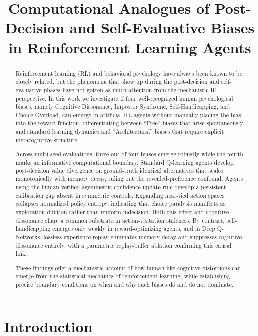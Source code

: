 \documentclass[conference]{IEEEtran}
\title{Computational Analogues of Post-Decision and Self-Evaluative Biases in Reinforcement Learning Agents}
\author{\IEEEauthorblockN{Ronak Daniel}
\IEEEauthorblockA{\textit{Computational Cognitive Systems Research}}}
\begin{document}
\maketitle

\begin{abstract}
Reinforcement learning (RL) and behavioral psychology have always been known to be closely related, but the phenomena that show up during the post-decision and self-evaluative phases have not gotten as much attention from the mechanistic RL perspective.
In this work we investigate if four well-recognized human psychological biases, namely Cognitive Dissonance, Impostor Syndrome, Self-Handicapping, and Choice Overload, can emerge in artificial RL agents without manually placing the bias into the reward function, differentiating between “Free” biases that arise spontaneously and standard learning dynamics and “Architectural” biases that require explicit metacognitive structure.

Across multi-seed evaluations, three out of four biases emerge robustly while the fourth marks an informative computational boundary. Standard Q-learning agents develop post-decision value divergence on ground-truth identical alternatives that scales monotonically with memory decay, ruling out the revealed-preference confound. Agents using the human-verified asymmetric confidence-update rule develop a persistent calibration gap absent in symmetric controls. Expanding near-tied action spaces collapses normalized policy entropy, indicating that choice paralysis manifests as exploration dilution rather than uniform indecision. Both this effect and cognitive dissonance share a common substrate in action-visitation staleness. By contrast, self-handicapping emerges only weakly in reward-optimizing agents, and in Deep Q-Networks, lossless experience replay eliminates memory decay and suppresses cognitive dissonance entirely, with a parametric replay-buffer ablation confirming this causal link.

These findings offer a mechanistic account of how human-like cognitive distortions can emerge from the statistical mechanics of reinforcement learning, while establishing precise boundary conditions on when and why such biases do and do not dominate.
\end{abstract}

\section{Introduction}
\end{document}
